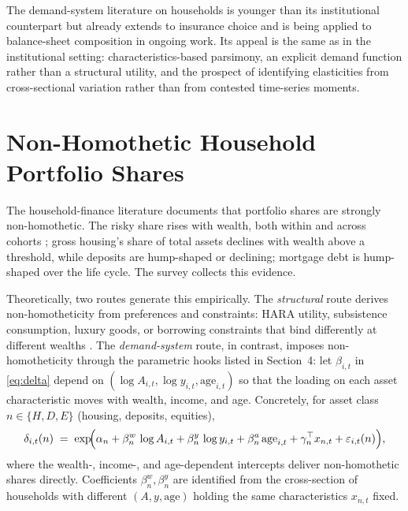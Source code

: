 \documentclass[11pt,a4paper]{article}
\newcommand{\eps}{\varepsilon}
\begin{document}
The demand-system literature on households is younger than its
institutional counterpart but already extends to insurance choice
\citep{koijen2016health} and is being applied to balance-sheet
composition in ongoing work. Its appeal is the same as in the
institutional setting: characteristics-based parsimony, an explicit
demand function rather than a structural utility, and the prospect of
identifying elasticities from cross-sectional variation rather than
from contested time-series moments.

\section{Non-Homothetic Household Portfolio Shares}\label{sec:nh}

The household-finance literature documents that portfolio shares are
strongly non-homothetic. The risky share rises with wealth, both within
and across cohorts
\citep{calvet2007down,calvet2009fight,carroll2002portfolios,bach2020rich,fagereng2020heterogeneity};
gross housing's share of total assets declines with wealth above a
threshold, while deposits are hump-shaped or declining; mortgage debt
is hump-shaped over the life cycle. The \citet{gomes2021household}
survey collects this evidence.

Theoretically, two routes generate this empirically. The
\emph{structural} route derives non-homotheticity from preferences and
constraints: HARA utility, subsistence consumption, luxury goods, or
borrowing constraints that bind differently at different wealths
\citep{wachter2010luxury,cocco2005portfolio,yao2005optimal,chetty2017effect}.
The \emph{demand-system} route, in contrast, imposes
non-homotheticity through the parametric hooks listed in Section~4: let
$\beta_{i,t}$ in \eqref{eq:delta} depend on $(\log A_{i,t}, \log y_{i,t},
\mathrm{age}_{i,t})$ so that the loading on each asset characteristic
moves with wealth, income, and age. Concretely, for asset class
$n\in\{H,D,E\}$ (housing, deposits, equities),
\begin{equation}
\delta_{i,t}(n) \;=\; \exp\!\Bigl( \alpha_n + \beta^{w}_n\,\log A_{i,t} + \beta^{y}_n\,\log y_{i,t} + \beta^{a}_n\,\mathrm{age}_{i,t} + \gamma_n^\top x_{n,t} + \eps_{i,t}(n) \Bigr),
\label{eq:hh-delta}
\end{equation}
where the wealth-, income-, and age-dependent intercepts deliver
non-homothetic shares directly. Coefficients $\beta^w_n,\beta^y_n$ are
identified from the cross-section of households with different
$(A,y,\mathrm{age})$ holding the same characteristics $x_{n,t}$ fixed.
\end{document}
